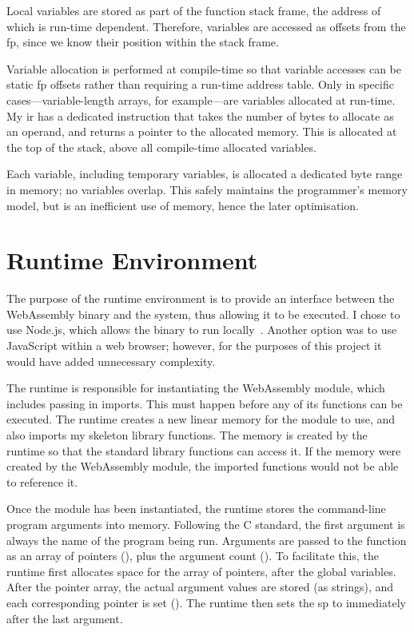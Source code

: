 \documentclass[00-main.tex]{subfiles}
\begin{document}
Local variables are stored as part of the function stack frame, the address of which is run-time dependent.
Therefore, variables are accessed as offsets from the \gls{fp}, since we know their position within the stack frame.

Variable allocation is performed at compile-time so that variable accesses can be static \gls{fp} offsets rather than requiring a run-time address table.
Only in specific cases---variable-length arrays, for example---are variables allocated at run-time.
My \gls{ir} has a dedicated  instruction that takes the number of bytes to allocate as an operand, and returns a pointer to the allocated memory.
This is allocated at the top of the stack, above all compile-time allocated variables.

Each variable, including temporary variables, is allocated a dedicated byte range in memory; no variables overlap.
This safely maintains the programmer's memory model, but is an inefficient use of memory, hence the later optimisation.

\section{Runtime Environment}\label{sec:impl:runtime}

The purpose of the runtime environment is to provide an interface between the WebAssembly binary and the system, thus allowing it to be executed.
I chose to use Node.js, which allows the binary to run locally~.
Another option was to use JavaScript within a web browser; however, for the purposes of this project it would have added unnecessary complexity.

The runtime is responsible for instantiating the WebAssembly module, which includes passing in imports.
This must happen before any of its functions can be executed.
The runtime creates a new linear memory for the module to use, and also imports my skeleton library functions.
The memory is created by the runtime so that the standard library functions can access it.
If the memory were created by the WebAssembly module, the imported functions would not be able to reference it.

Once the module has been instantiated, the runtime stores the command-line program arguments into memory.
Following the C standard, the first argument is always the name of the program being run.
Arguments are passed to the  function as an array of  pointers (), plus the argument count ().
To facilitate this, the runtime first allocates space for the array of pointers, after the global variables.
After the pointer array, the actual argument values are stored (as strings), and each corresponding pointer is set ().
The runtime then sets the \gls{sp} to immediately after the last argument.
\end{document}
